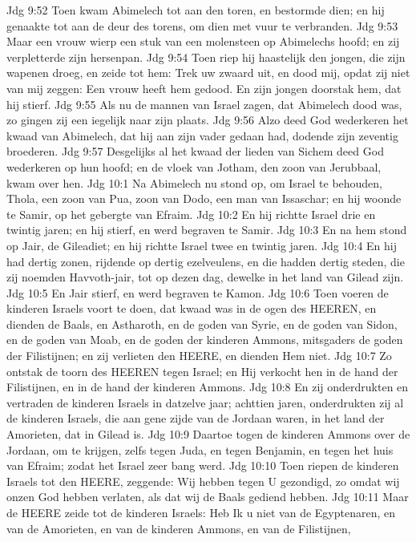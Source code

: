 Jdg 9:52  Toen kwam Abimelech tot aan den toren, en bestormde dien; en hij genaakte tot aan de deur des torens, om dien met vuur te verbranden.
Jdg 9:53  Maar een vrouw wierp een stuk van een molensteen op Abimelechs hoofd; en zij verpletterde zijn hersenpan.
Jdg 9:54  Toen riep hij haastelijk den jongen, die zijn wapenen droeg, en zeide tot hem: Trek uw zwaard uit, en dood mij, opdat zij niet van mij zeggen: Een vrouw heeft hem gedood. En zijn jongen doorstak hem, dat hij stierf.
Jdg 9:55  Als nu de mannen van Israel zagen, dat Abimelech dood was, zo gingen zij een iegelijk naar zijn plaats.
Jdg 9:56  Alzo deed God wederkeren het kwaad van Abimelech, dat hij aan zijn vader gedaan had, dodende zijn zeventig broederen.
Jdg 9:57  Desgelijks al het kwaad der lieden van Sichem deed God wederkeren op hun hoofd; en de vloek van Jotham, den zoon van Jerubbaal, kwam over hen.
Jdg 10:1  Na Abimelech nu stond op, om Israel te behouden, Thola, een zoon van Pua, zoon van Dodo, een man van Issaschar; en hij woonde te Samir, op het gebergte van Efraim.
Jdg 10:2  En hij richtte Israel drie en twintig jaren; en hij stierf, en werd begraven te Samir.
Jdg 10:3  En na hem stond op Jair, de Gileadiet; en hij richtte Israel twee en twintig jaren.
Jdg 10:4  En hij had dertig zonen, rijdende op dertig ezelveulens, en die hadden dertig steden, die zij noemden Havvoth-jair, tot op dezen dag, dewelke in het land van Gilead zijn.
Jdg 10:5  En Jair stierf, en werd begraven te Kamon.
Jdg 10:6  Toen voeren de kinderen Israels voort te doen, dat kwaad was in de ogen des HEEREN, en dienden de Baals, en Astharoth, en de goden van Syrie, en de goden van Sidon, en de goden van Moab, en de goden der kinderen Ammons, mitsgaders de goden der Filistijnen; en zij verlieten den HEERE, en dienden Hem niet.
Jdg 10:7  Zo ontstak de toorn des HEEREN tegen Israel; en Hij verkocht hen in de hand der Filistijnen, en in de hand der kinderen Ammons.
Jdg 10:8  En zij onderdrukten en vertraden de kinderen Israels in datzelve jaar; achttien jaren, onderdrukten zij al de kinderen Israels, die aan gene zijde van de Jordaan waren, in het land der Amorieten, dat in Gilead is.
Jdg 10:9  Daartoe togen de kinderen Ammons over de Jordaan, om te krijgen, zelfs tegen Juda, en tegen Benjamin, en tegen het huis van Efraim; zodat het Israel zeer bang werd.
Jdg 10:10  Toen riepen de kinderen Israels tot den HEERE, zeggende: Wij hebben tegen U gezondigd, zo omdat wij onzen God hebben verlaten, als dat wij de Baals gediend hebben.
Jdg 10:11  Maar de HEERE zeide tot de kinderen Israels: Heb Ik u niet van de Egyptenaren, en van de Amorieten, en van de kinderen Ammons, en van de Filistijnen,
